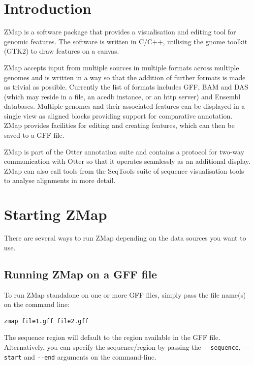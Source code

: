\documentclass[letterpaper]{article}
\begin{document}
\setcounter{tocdepth}{10}
\renewcommand\contentsname{Contents}

\clearpage\tableofcontents

\clearpage
\section{Introduction}

ZMap is a software package that provides a visualisation and editing tool for genomic features. The software is written in C/C++, utilising the gnome toolkit (GTK2) to draw features on a canvas.

ZMap accepts input from multiple sources in multiple formats across multiple genomes and is written in a way so that the addition of further formats is made as trivial as possible. Currently the list of formats includes GFF, BAM and DAS (which may reside in a file, an acedb instance, or an http server) and Ensembl databases. Multiple genomes and their associated features can be displayed in a single view as aligned blocks providing support for comparative annotation. ZMap provides facilities for editing and creating features, which can then be saved to a GFF file.

ZMap is part of the Otter annotation suite and contains a protocol for two-way communication with Otter so that it operates seamlessly as an additional display. ZMap can also call tools from the SeqTools suite of sequence visualisation tools to analyse alignments in more detail.

\clearpage
\section{Starting ZMap}
There are several ways to run ZMap depending on the data sources you want to use.

\subsection{Running ZMap on a GFF file}
To run ZMap standalone on one or more GFF files, simply pass the file name(s) on the command line:
\begin{lstlisting}
zmap file1.gff file2.gff
\end{lstlisting}

The sequence region will default to the region available in the GFF file. Alternatively, you can specify the sequence/region by passing the \lstinline{--sequence}, \lstinline{--start} and \lstinline{--end} arguments on the command-line.
\end{document}
